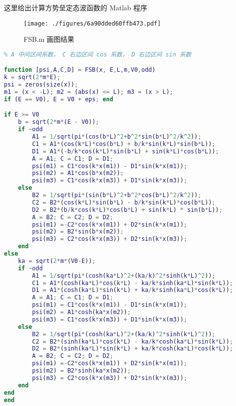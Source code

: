 

这里给出计算方势垒定态波函数的 Matlab 程序
\begin{figure}[ht]
\centering
\texttt{[image: ./figures/6a90dded60ffb473.pdf]}
\caption{FSB.m 画图结果} \label{fig_FSBplt_1}
\end{figure}

\begin{lstlisting}[language=matlab, caption=FSB.m]
% m 质量，V0 势垒，E 能量， L 势垒半宽， odd 奇函数 true 偶函数 false
% A 中间区间系数， C 右边区间 cos 系数， D 右边区间 sin 系数

function [psi,A,C,D] = FSB(x, E,L,m,V0,odd)
k = sqrt(2*m*E);
psi = zeros(size(x));
m1 = (x < -L); m2 = (abs(x) <= L); m3 = (x > L);
if (E == V0), E = V0 + eps; end

if E >= V0
    b = sqrt(2*m*(E - V0));
    if ~odd
        A1 = 1/sqrt(pi*(cos(b*L)^2+b^2*sin(b*L)^2/k^2));
        C1 = A1*(cos(k*L)*cos(b*L) + b/k*sin(k*L)*sin(b*L));
        D1 = A1*(-b/k*cos(k*L)*sin(b*L) + sin(k*L)*cos(b*L));
        A = A1; C = C1; D = D1;
        psi(m1) = C1*cos(k*x(m1)) - D1*sin(k*x(m1));
        psi(m2) = A1*cos(b*x(m2));
        psi(m3) = C1*cos(k*x(m3)) + D1*sin(k*x(m3));
    else
        B2 = 1/sqrt(pi*(sin(b*L)^2+b^2*cos(b*L)^2/k^2));
        C2 = B2*(cos(k*L)*sin(b*L) - b/k*sin(k*L)*cos(b*L));
        D2 = B2*(b/k*cos(k*L)*cos(b*L) + sin(k*L) * sin(b*L));
        A = B2; C = C2; D = D2;
        psi(m1) =-C2*cos(k*x(m1)) + D2*sin(k*x(m1));
        psi(m2) = B2*sin(b*x(m2));
        psi(m3) = C2*cos(k*x(m3)) + D2*sin(k*x(m3));
    end
else
    ka = sqrt(2*m*(V0-E));
    if ~odd
        A1 = 1/sqrt(pi*(cosh(ka*L)^2+(ka/k)^2*sinh(k*L)^2));
        C1 = A1*(cosh(ka*L)*cos(k*L) - ka/k*sinh(ka*L)*sin(k*L));
        D1 = A1*(cosh(ka*L)*sin(k*L) + ka/k*sinh(ka*L)*cos(k*L));
        A = A1; C = C1; D = D1;
        psi(m1) = C1*cos(k*x(m1)) - D1*sin(k*x(m1));
        psi(m2) = A1*cosh(ka*x(m2));
        psi(m3) = C1*cos(k*x(m3)) + D1*sin(k*x(m3));
    else
        B2 = 1/sqrt(pi*(cosh(ka*L)^2+(ka/k)^2*sinh(k*L)^2));
        C2 = B2*(sinh(ka*L)*cos(k*L) - ka/k*cosh(ka*L)*sin(k*L));
        D2 = B2*(sinh(ka*L)*sin(k*L) + ka/k*cosh(ka*L)*cos(k*L));
        A = B2; C = C2; D = D2;
        psi(m1) =-C2*cos(k*x(m1)) + D2*sin(k*x(m1));
        psi(m2) = B2*sinh(ka*x(m2));
        psi(m3) = C2*cos(k*x(m3)) + D2*sin(k*x(m3));
    end
end
end
\end{lstlisting}

